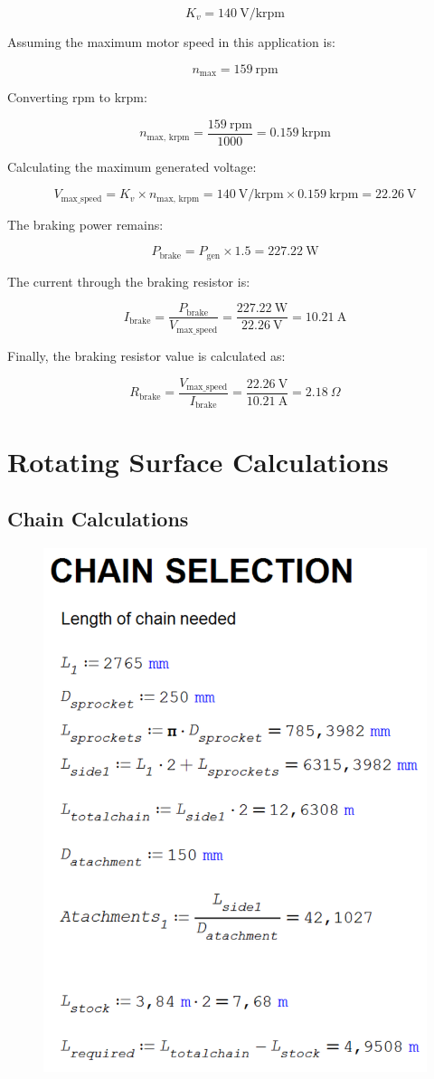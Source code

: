 \[
K_v = 140\ \text{V/krpm}
\]

Assuming the maximum motor speed in this application is:

\[
n_{\text{max}} = 159\ \text{rpm}
\]

Converting rpm to krpm:

\[
n_{\text{max, krpm}} = \frac{159\ \text{rpm}}{1000} = 0.159\ \text{krpm}
\]

Calculating the maximum generated voltage:

\[
V_{\text{max\_speed}} = K_v \times n_{\text{max, krpm}} = 140\ \text{V/krpm} \times 0.159\ \text{krpm} = 22.26\ \text{V}
\]

The braking power remains:

\[
P_{\text{brake}} = P_{\text{gen}} \times 1.5 = 227.22\ \text{W}
\]

The current through the braking resistor is:

\[
I_{\text{brake}} = \frac{P_{\text{brake}}}{V_{\text{max\_speed}}} = \frac{227.22\ \text{W}}{22.26\ \text{V}} = 10.21\ \text{A}
\]

Finally, the braking resistor value is calculated as:

\[
R_{\text{brake}} = \frac{V_{\text{max\_speed}}}{I_{\text{brake}}} = \frac{22.26\ \text{V}}{10.21\ \text{A}} = 2.18\ \Omega
\]



\chapter{Rotating Surface Calculations}

\section{Chain Calculations}
\label{calcs:chain}
\begin{figure}[H]
    \centering
    \includegraphics[width=0.8\linewidth]{chaps-append/calcs/chain-length-calcs.png}
\end{figure}



